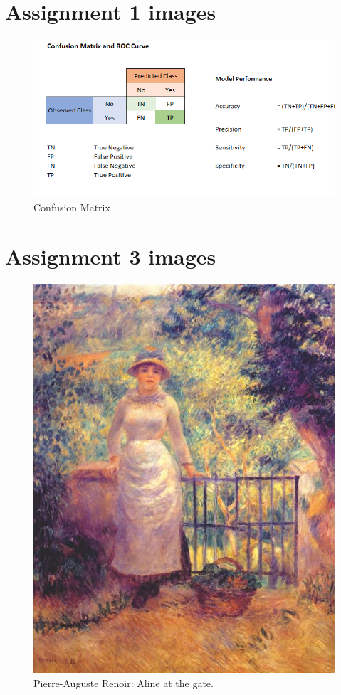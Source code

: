 \section{Assignment 1 images}

\label{app:confusion_matrix}
\begin{figure}[H]
\centering
\includegraphics[scale=0.55]{Graphics/Assignment1/ConfusionMatrix.png}
\caption{Confusion Matrix}
\label{fig:confusion_Matrix}
\end{figure}


\section{Assignment 3 images}
\begin{figure}[H]
    \centering
    \includegraphics[scale=0.3]{Graphics/Assignment3/renoir.png}
    \caption{Pierre-Auguste Renoir: Aline at the gate.}
    \label{fig:renoir}
\end{figure}


